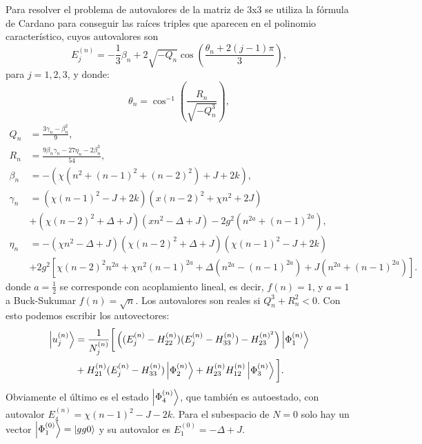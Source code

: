 Para resolver el problema de autovalores de la matriz de 3x3 se utiliza la fórmula de Cardano para conseguir las ra\'ices triples que aparecen en el polinomio caracter\'istico, cuyos autovalores son
\begin{equation}
    E_j^{(n)}=-\frac{1}{3}\beta_n+2\sqrt{-Q_n}\cos{\left(\frac{\theta_n+2(j-1)\pi}{3}\right)},
    \label{ec4:autoenergias}
\end{equation}
para $j=1,2,3$, y donde:
\begin{equation}
    \theta_n=\cos^{-1}\left(\frac{R_n}{\sqrt{-Q_n^3}}\right),
\end{equation}
\begin{equation}
    \begin{aligned}
        Q_n & = \frac{3\gamma_n-\beta_n^2}{9} ,\\
        R_n & = \frac{9\beta_n\gamma_n-27\eta_n-2\beta_n^3}{54} ,\\
        \beta_n & = - \left( \chi(n^2+(n-1)^2+(n-2)^2)+J+2k\right) ,\\
        \gamma_n & = (\chi(n-1)^2 - J + 2k)(x(n-2)^2+\chi n^2+2J) \\ 
        & +(\chi (n-2)^2+\Delta+J)(x n^2-\Delta+J)-2g^2(n^{2a}+(n-1)^{2a}) ,\\ 
        \eta_n &= -(\chi n^2-\Delta+J)(\chi(n-2)^2+\Delta+J)(\chi(n-1)^2-J+2k) \\
        &+2g^2 \left[  \chi(n-2)^2n^{2a}+\chi n^2(n-1)^{2a}+\Delta\left(n^{2a}-(n-1)^{2a}\right) +J(n^{2a}+(n-1)^{2a})\right].
    \end{aligned} 
    \label{ec4:parametros solucion}
\end{equation}
donde $a=\frac{1}{2}$ se corresponde con acoplamiento lineal, es decir, $f(n)=1$, y $a=1$ a Buck-Sukumar $f(n)=\sqrt{n}$. Los autovalores son reales si $Q_n^3+R_n^2<0$.
Con esto podemos escribir los autovectores:
\begin{equation}
    \begin{split}
        \ket{u_j^{(n)}} &= \frac{1}{N_j^{(n)}} \bigg[ \left((E_j^{(n)} - H_{22}^{(n)})(E_j^{(n)}-H_{33}^{(n)}) - H_{23}^{(n)^2} \right) \ket{\Phi_1^{(n)}} \\ &+ H_{21}^{(n)}(E_j^{(n)}-H_{33}^{(n)})\ket{\Phi_2^{(n)}} + H_{23}^{(n)}H_{12}^{(n)}\ket{\Phi_3^{(n)}}\bigg].
    \end{split}
\end{equation}
Obviamente el último es el estado $\ket{\Phi_4^{(n)}}$, que también es autoestado, con autovalor $E_4^{(n)}=\chi(n-1)^2-J-2k$.
Para el subespacio de $N=0$ solo hay un vector $\ket{\Phi_1^{(0)}}=\ket{gg0}$ y su autovalor es $E_1^{(0)}=-\Delta+J$.
